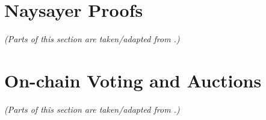 \documentclass{article}
\renewcommand*{\backrefalt}[4]{}
\begin{document}
\newpage


\newpage %


\renewcommand*{\backrefalt}[4]{\scriptsize%
    \ifcase #1%
          \or \textit{[p.~#2]}%
          \else \textit{[pp.~#2]}%
    \fi%
}

\newpage %
\tableofcontents

\newpage %


\newpage %


\newpage %
\section{Naysayer Proofs}\label{sec:naysayer}
\textit{(Parts of this section are taken/adapted from \cite{FC:SerGlaBon24}.)}

\bigskip








\newpage %
\section{On-chain Voting and Auctions}\label{sec:cicada}
\textit{(Parts of this section are taken/adapted from \cite{CTB:GSZB24}.)}













\end{document}
